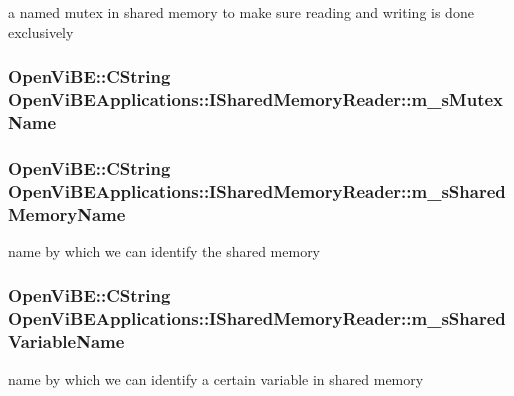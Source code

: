 \label{classOpenViBEApplications_1_1ISharedMemoryReader_acb7b53ef01ff8121494d7b6ddeccab82}
a named mutex in shared memory to make sure reading and writing is done exclusively \hypertarget{classOpenViBEApplications_1_1ISharedMemoryReader_affed657b86f9796a264c9422b2b93fbd}{
\subsubsection[{m\_\-sMutexName}]{\setlength{\rightskip}{0pt plus 5cm}OpenViBE::CString {\bf OpenViBEApplications::ISharedMemoryReader::m\_\-sMutexName}}}
\label{classOpenViBEApplications_1_1ISharedMemoryReader_affed657b86f9796a264c9422b2b93fbd}
\hypertarget{classOpenViBEApplications_1_1ISharedMemoryReader_ac3dc5e78dd9876ee0565946aeaa3c4bd}{
\subsubsection[{m\_\-sSharedMemoryName}]{\setlength{\rightskip}{0pt plus 5cm}OpenViBE::CString {\bf OpenViBEApplications::ISharedMemoryReader::m\_\-sSharedMemoryName}}}
\label{classOpenViBEApplications_1_1ISharedMemoryReader_ac3dc5e78dd9876ee0565946aeaa3c4bd}
name by which we can identify the shared memory \hypertarget{classOpenViBEApplications_1_1ISharedMemoryReader_ad6501b984c01074cc256480b64d6c75b}{
\subsubsection[{m\_\-sSharedVariableName}]{\setlength{\rightskip}{0pt plus 5cm}OpenViBE::CString {\bf OpenViBEApplications::ISharedMemoryReader::m\_\-sSharedVariableName}}}
\label{classOpenViBEApplications_1_1ISharedMemoryReader_ad6501b984c01074cc256480b64d6c75b}
name by which we can identify a certain variable in shared memory 

